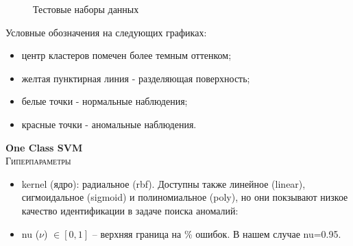 \documentclass[12pt]{article}
\begin{document}
    \begin{figure}[h!]
        \centering
        \caption{Тестовые наборы данных}
        \label{sec:Research:Model:Visualization:fig:featueres}
    \end{figure}

    \noindent Условные обозначения на следующих графиках:
    \begin{itemize}
        \item центр кластеров помечен более темным оттенком;
        \item желтая пунктирная линия - разделяющая поверхность;
        \item белые точки - нормальные наблюдения;
        \item красные точки - аномальные наблюдения.
    \end{itemize}
    \newpage

    \textbf{One Class SVM} \\

    \noindent \textsc{Гиперпараметры}
    \begin{itemize}
        \item kernel (ядро): радиальное (rbf). Доступны также линейное (linear), сигмоидальное (sigmoid) и полиномиальное (poly), но они покзывают низкое качество идентификации в задаче поиска аномалий:
        \item nu ($\nu$) $\in [0, 1]$ – верхняя граница на \% ошибок. В нашем случае nu=0.95.
    \end{itemize}
\end{document}
